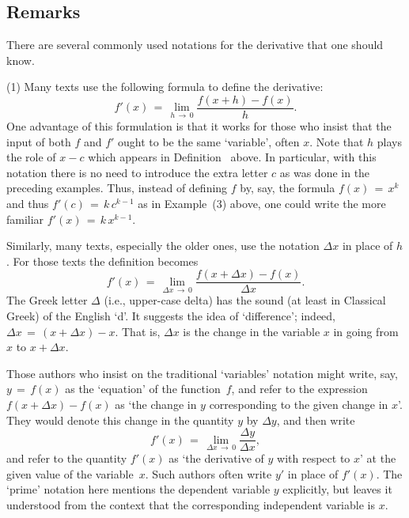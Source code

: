 \V

            \subsection{\small{\bf Remarks}}
            \label{RemrkE20.35}

\V

        There are several commonly used notations for the derivative that one should know.

\V

\hspace*{\parindent}(1) Many texts use the following formula to define the derivative:
        \begin{displaymath}
        f'(x) \,=\, \lim_{h \,{\rightarrow}\, 0} \frac{f(x+h)-f(x)}{h}.
        \end{displaymath}
    One advantage of this formulation is that it works for those who insist that the input of both $f$ and $f'$ ought to be the same `variable', often $x$.
    Note that $h$ plays the role of $x-c$ which appears in Definition~ above.
    In particular, with this notation there is no need to introduce the extra letter $c$ as was done in the preceding examples.
    Thus, instead of defining $f$ by, say, the formula $f(x) \,=\, x^{k}$ and thus $f'(c) \,=\, k\,c^{k-1}$ as in Example~(3) above,
    one could write the more familiar $f'(x) \,=\, k\,x^{k-1}$.

        Similarly, many texts, especially the older ones, use the notation ${\Delta}x$ in place of $h$.
    For those texts the definition becomes
        \begin{displaymath}
        f'(x) \,=\, \lim_{{\Delta}x \,{\rightarrow}\, 0} \frac{f(x+{\Delta}x)-f(x)}{{\Delta}x}.
        \end{displaymath}
    The Greek letter ${\Delta}$ (i.e., upper-case delta) has the sound (at least in Classical Greek) of the English `d'.
    It suggests the idea of `difference'; indeed, ${\Delta}x \,=\, (x+{\Delta}x) - x$. That is, ${\Delta}x$ is the change in the variable $x$ in going from $x$ to $x+{\Delta}x$.

        Those authors who insist on the traditional `variables' notation might write, say, $y \,=\, f(x)$ as the `equation' of the function~$f$,
    and refer to the expression $f(x+{\Delta}x)-f(x)$ as `the change in $y$ corresponding to the given change in $x$'. They would denote this change in the quantity $y$ by ${\Delta}y$, and then write
        \begin{displaymath}
        f'(x) \,=\, \lim_{{\Delta}x \,{\rightarrow}\, 0} \frac{{\Delta}y}{{\Delta}x},
        \end{displaymath}
    and refer to the quantity $f'(x)$ as `the derivative of $y$ with respect to $x$' at the given value of the variable~$x$.
    Such authors often write $y'$ in place of $f'(x)$. The `prime' notation here mentions the dependent variable $y$ explicitly, but leaves it understood from the context that the corresponding independent variable is $x$.

